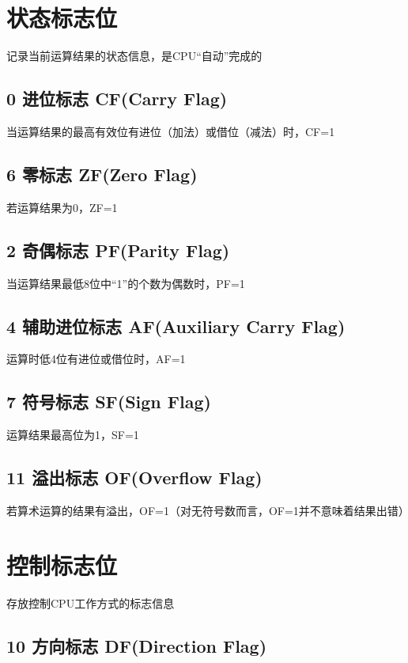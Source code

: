 \documentclass{article}
\begin{document}
\section{状态标志位}

记录当前运算结果的状态信息，是CPU“自动”完成的

\subsection{0 进位标志 CF(Carry Flag)}

当运算结果的最高有效位有进位（加法）或借位（减法）时，CF=1

\subsection{6 零标志 ZF(Zero Flag)}

若运算结果为0，ZF=1

\subsection{2 奇偶标志 PF(Parity Flag)}

当运算结果最低8位中“1”的个数为偶数时，PF=1

\subsection{4 辅助进位标志 AF(Auxiliary Carry Flag)}

运算时低4位有进位或借位时，AF=1

\subsection{7 符号标志 SF(Sign Flag)}

运算结果最高位为1，SF=1

\subsection{11 溢出标志 OF(Overflow Flag)}

若算术运算的结果有溢出，OF=1（对无符号数而言，OF=1并不意味着结果出错）

\section{控制标志位}

存放控制CPU工作方式的标志信息

\subsection{10 方向标志 DF(Direction Flag)}
\end{document}
